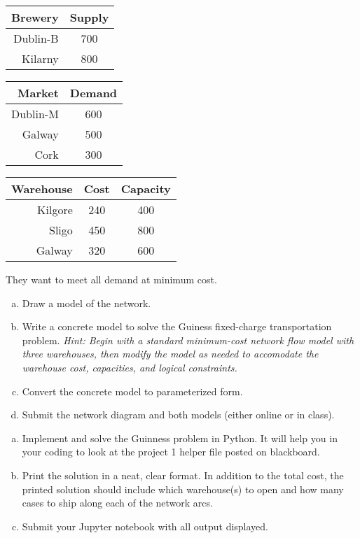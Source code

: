 \documentclass[11pt]{article}
\theoremstyle{definition}
\begin{document}
\begin{tabular}{r|c}
Brewery & Supply \\
\hline
Dublin-B & 700 \\
Kilarny & 800 \\
\end{tabular}
\hspace{1cm}
\begin{tabular}{r|c}
Market & Demand \\
\hline
Dublin-M & 600 \\
Galway & 500 \\
Cork & 300 \\
\end{tabular}
\hspace{1cm}
\begin{tabular}{r|cc}
Warehouse & Cost & Capacity \\
\hline
Kilgore & 240 & 400 \\
Sligo & 450 & 800 \\
Galway & 320 & 600
\end{tabular}

They want to meet all demand at minimum cost.

\newpage
\begin{enumerate}[a.]
\item Draw a model of the network.
\item Write a concrete model to solve the Guiness fixed-charge transportation problem.  \emph{Hint:  Begin with a standard minimum-cost network flow model with three warehouses, then modify the model as needed to accomodate the warehouse cost, capacities, and logical constraints.}
\item Convert the concrete model to parameterized form.
\item Submit the network diagram and both models (either online or in class).
\end{enumerate}

\begin{enumerate}[a.]
\item Implement and solve the Guinness problem in Python. It will help you in your coding to look at the project 1 helper file posted on blackboard.
\item Print the solution in a neat, clear format.  In addition to the total cost, the printed solution should include which warehouse(s) to open and how many cases to ship along each of the network arcs.
\item Submit your Jupyter notebook with all output displayed.
\end{enumerate}
		
\end{document}
